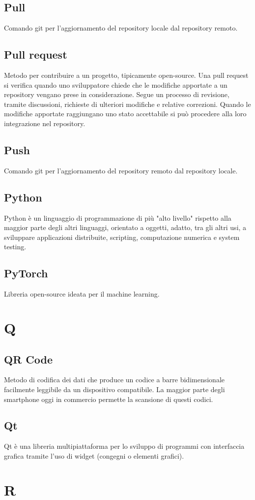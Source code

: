\subsection{Pull} Comando git per l'aggiornamento del repository locale dal repository remoto.
\subsection{Pull request} Metodo per contribuire a un progetto, tipicamente open-source. Una pull request si verifica quando uno sviluppatore chiede che le modifiche apportate a un repository vengano prese in considerazione. Segue un processo di revisione, tramite discussioni, richieste di ulteriori modifiche e relative correzioni. Quando le modifiche apportate raggiungano uno stato accettabile si può procedere alla loro integrazione nel repository.
\subsection{Push} Comando git per l'aggiornamento del repository remoto dal repository locale.
\subsection{Python} Python è un linguaggio di programmazione di più "alto livello" rispetto alla maggior parte degli altri linguaggi, orientato a oggetti, adatto, tra gli altri usi, a sviluppare applicazioni distribuite, scripting, computazione numerica e system testing.
\subsection{PyTorch} Libreria open-source ideata per il machine learning.
\newpage \section{Q}
\subsection{QR Code} Metodo di codifica dei dati che produce un codice a barre bidimensionale facilmente leggibile da un dispositivo compatibile. La maggior parte degli smartphone oggi in commercio permette la scansione di questi codici.
\subsection{Qt} Qt è una libreria multipiattaforma per lo sviluppo di programmi con interfaccia grafica tramite l'uso di widget (congegni o elementi grafici).
\newpage \section{R}
